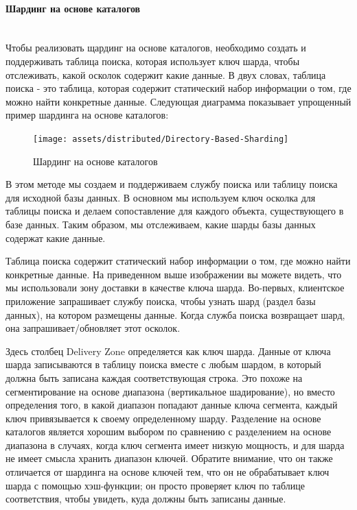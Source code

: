 \paragraph{Шардинг на основе каталогов} ~\\
Чтобы реализовать щардинг на основе каталогов, необходимо создать и поддерживать таблица поиска, которая использует ключ
шарда, чтобы отслеживать, какой осколок содержит какие данные. В двух словах, таблица поиска - это таблица, которая
содержит статический набор информации о том, где можно найти конкретные данные. Следующая диаграмма показывает
упрощенный пример шардинга на основе каталогов:

\begin{figure}[H]
    \centering
    \texttt{[image: assets/distributed/Directory-Based-Sharding]}
    \caption{Шардинг на основе каталогов}
    \label{fig:Directory-Based-Sharding}
\end{figure}

В этом методе мы создаем и поддерживаем службу поиска или таблицу поиска для исходной базы данных. В основном мы
используем ключ осколка для таблицы поиска и делаем сопоставление для каждого объекта, существующего в базе данных.
Таким образом, мы отслеживаем, какие шарды базы данных содержат какие данные.

Таблица поиска содержит статический набор информации о том, где можно найти конкретные данные. На приведенном выше
изображении вы можете видеть, что мы использовали зону доставки в качестве ключа шарда. Во-первых, клиентское
приложение запрашивает службу поиска, чтобы узнать шард (раздел базы данных), на котором размещены данные. Когда
служба поиска возвращает шард, она запрашивает/обновляет этот осколок.

Здесь столбец Delivery Zone определяется как ключ шарда. Данные от ключа шарда записываются в таблицу поиска вместе с
любым шардом, в который должна быть записана каждая соответствующая строка. Это похоже на сегментирование на основе
диапазона (вертикальное шадирование), но вместо определения того, в какой диапазон попадают данные ключа сегмента,
каждый ключ привязывается к своему определенному шарду. Разделение на основе каталогов является хорошим выбором по
сравнению с разделением на основе диапазона в случаях, когда ключ сегмента имеет низкую мощность, и для шарда не
имеет смысла хранить диапазон ключей. Обратите внимание, что он также отличается от шардинга на основе ключей тем, что
он не обрабатывает ключ шарда с помощью хэш-функции; он просто проверяет ключ по таблице соответствия, чтобы увидеть,
куда должны быть записаны данные.

